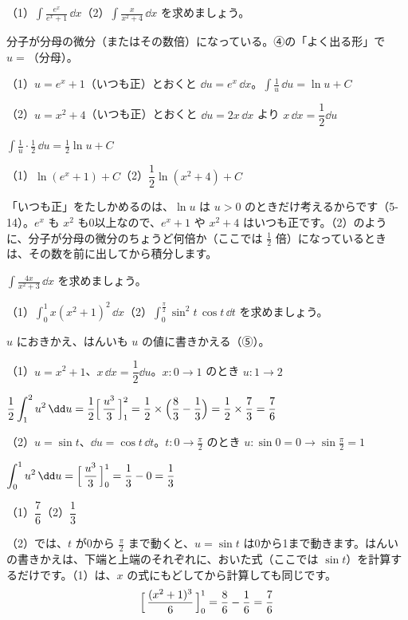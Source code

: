 \begin{reidai}[分母の微分が分子にある形]
（1）$\displaystyle\int\frac{e^x}{e^x+1}\,\dd x$\quad（2）$\displaystyle\int\frac{x}{x^2+4}\,\dd x$ を求めましょう。\par
\kangaekata 分子が分母の微分（またはその数倍）になっている。④の「よく出る形」で $u=$（分母）。\par
\shiki（1）$u=e^x+1$（いつも正）とおくと $\dd u=e^x\,\dd x$。$\displaystyle\int\frac{1}{u}\,\dd u=\ln u+C$\par
\hspace*{2.6\zw}（2）$u=x^2+4$（いつも正）とおくと $\dd u=2x\,\dd x$ より $x\,\dd x=\dfrac{1}{2}\dd u$\par
\hspace*{4.6\zw}$\displaystyle\int\frac{1}{u}\cdot\frac{1}{2}\,\dd u=\frac{1}{2}\ln u+C$\par
\kotae （1）$\ln(e^x+1)+C$\quad（2）$\dfrac{1}{2}\ln(x^2+4)+C$
\end{reidai}
「いつも正」をたしかめるのは、$\ln u$ は $u>0$ のときだけ考えるからです（5-14）。$e^x$ も $x^2$ も0以上なので、$e^x+1$ や $x^2+4$ はいつも正です。（2）のように、分子が分母の微分のちょうど何倍か（ここでは $\frac{1}{2}$ 倍）になっているときは、その数を前に出してから積分します。

\begin{jibun}
$\displaystyle\int\frac{4x}{x^2+3}\,\dd x$ を求めましょう。
\end{jibun}

\begin{reidai}[定積分の置換]
（1）$\displaystyle\int_0^1x(x^2+1)^2\,\dd x$\quad（2）$\displaystyle\int_0^{\frac{\pi}{2}}\sin^2t\,\cos t\,\dd t$ を求めましょう。\par
\kangaekata $u$ におきかえ、はんいも $u$ の値に書きかえる（⑤）。\par
\shiki（1）$u=x^2+1$、$x\,\dd x=\dfrac{1}{2}\dd u$。$x:0\to1$ のとき $u:1\to2$\par\vspace{2pt}
\hspace*{4.6\zw}$\displaystyle\frac{1}{2}\int_1^2u^2\,\dd u=\frac{1}{2}\Bigl[\,\frac{u^3}{3}\,\Bigr]_1^2=\frac{1}{2}\times\Bigl(\frac{8}{3}-\frac{1}{3}\Bigr)=\frac{1}{2}\times\frac{7}{3}=\frac{7}{6}$\par
\hspace*{2.6\zw}（2）$u=\sin t$、$\dd u=\cos t\,\dd t$。$t:0\to\frac{\pi}{2}$ のとき $u:\sin0=0\to\sin\frac{\pi}{2}=1$\par\vspace{2pt}
\hspace*{4.6\zw}$\displaystyle\int_0^1u^2\,\dd u=\Bigl[\,\frac{u^3}{3}\,\Bigr]_0^1=\frac{1}{3}-0=\frac{1}{3}$\par
\kotae （1）$\dfrac{7}{6}$\quad（2）$\dfrac{1}{3}$
\end{reidai}
（2）では、$t$ が0から $\frac{\pi}{2}$ まで動くと、$u=\sin t$ は0から1まで動きます。はんいの書きかえは、下端と上端のそれぞれに、おいた式（ここでは $\sin t$）を計算するだけです。（1）は、$x$ の式にもどしてから計算しても同じです。
\[ \Bigl[\,\frac{(x^2+1)^3}{6}\,\Bigr]_0^1=\frac{8}{6}-\frac{1}{6}=\frac{7}{6} \]

